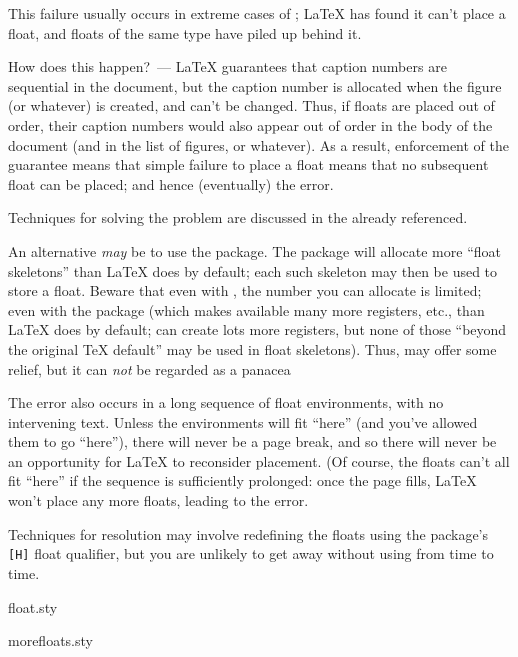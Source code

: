 This failure usually occurs in extreme cases of %
;
\LaTeX{} has found it can't place a float, and floats of the same type
have piled up behind it.

How does this happen?~--- \LaTeX{} guarantees that caption numbers are
sequential in the document, but the caption number is allocated when
the figure (or whatever) is created, and can't be changed.  Thus, if
floats are placed out of order, their caption numbers would also
appear out of order in the body of the document (and in the list of
figures, or whatever).  As a result, enforcement of the guarantee
means that simple failure to place a float means that no subsequent
float can be placed; and hence (eventually) the error.

Techniques for solving the problem are discussed in the %
 already referenced.

An alternative \emph{may} be to use the  package.
The package will allocate more ``float skeletons'' than \LaTeX{}
does by default; each such skeleton may then be used to store a
float.  Beware that even with , the number you can
allocate is limited; even with the  package (which makes
available many more registers, etc., than \LaTeX{} does by default;
\eTeX{} can create lots more registers, but none of those ``beyond
the original \TeX{} default'' may be used in float skeletons).  Thus,
 may offer some relief, but it can \emph{not} be
regarded as a panacea

The error also occurs in a long sequence of float environments, with
no intervening text.  Unless the environments will fit ``here'' (and
you've allowed them to go ``here''), there will never be a page break,
and so there will never be an opportunity for \LaTeX{} to reconsider
placement.  (Of course, the floats can't all fit ``here'' if the
sequence is sufficiently prolonged: once the page fills, \LaTeX{}
won't place any more floats, leading to the error.

Techniques for resolution may involve redefining the floats using the
 package's \texttt{[H]} float qualifier, but you are unlikely
to get away without using  from time to time.
\begin{ctanrefs}
\item[float.sty]
\item[morefloats.sty]
\end{ctanrefs}

